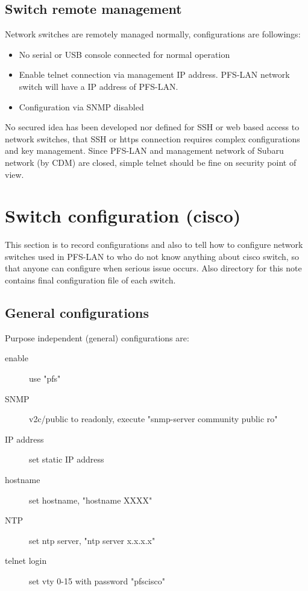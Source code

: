 \documentclass[a4paper,notitlepage]{article}
\begin{document}
\subsection{Switch remote management}

Network switches are remotely managed normally, configurations are followings: 

\begin{itemize}
  \item No serial or USB console connected for normal operation
  \item Enable telnet connection via management IP address. PFS-LAN network 
    switch will have a IP address of PFS-LAN.
  \item Configuration via SNMP disabled
\end{itemize}

No secured idea has been developed nor defined for SSH or web based access to 
network switches, that SSH or https connection requires complex configurations 
and key management. Since PFS-LAN and management network of Subaru network (by 
CDM) are closed, simple telnet should be fine on security point of view.

\section{Switch configuration (cisco)}

This section is to record configurations and also to tell how to configure 
network switches used in PFS-LAN to who do not know anything about cisco 
switch, so that anyone can configure when serious issue occurs. 
Also directory for this note contains final configuration file of each 
switch.

\subsection{General configurations}

Purpose independent (general) configurations are:

\begin{description}
  \item[enable] use "pfs"
  \item[SNMP] v2c/public to readonly, execute "snmp-server community public ro"
  \item[IP address] set static IP address
  \item[hostname] set hostname, "hostname XXXX"
  \item[NTP] set ntp server, "ntp server x.x.x.x"
  \item[telnet login] set vty 0-15 with password "pfscisco"
\end{description}
\end{document}
